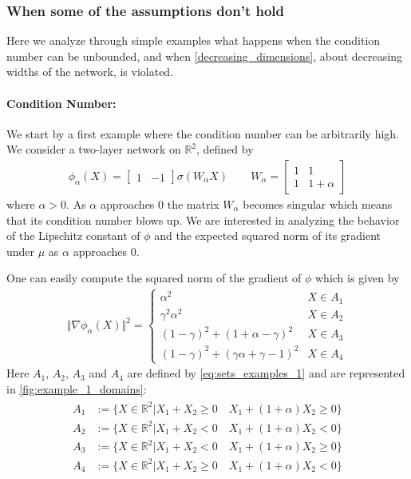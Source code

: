 \documentclass{article}
\newcommand{\R}{\mathbb R}
\begin{document}
\subsubsection{When some of the assumptions don't hold} \label{sec:counterexamples}
Here we analyze through simple examples what happens when the condition number can be unbounded, and when \cref{decreasing_dimensions}, about decreasing widths of the network, is violated.
\paragraph{Condition Number:}\label{example_condition_number}
We start by a first example where the condition number can be arbitrarily high. We consider a two-layer network on $\R^2$, defined by
\begin{align}
  \phi_{\alpha}(X)= \begin{bmatrix}1 & -1\end{bmatrix} \sigma(W_\alpha X) \qquad W_{\alpha} = \begin{bmatrix}
    1 & 1\\
    1 & 1+\alpha
  \end{bmatrix}
\label{eq:example_1}
\end{align}
where $\alpha >0$. As $\alpha$ approaches $0$ the matrix $W_\alpha$ becomes singular which means that its condition number blows up. We are interested in analyzing the behavior of the Lipschitz constant of $\phi$ and the expected squared norm of its gradient under $\mu$ as $\alpha$ approaches $0$.

One can easily compute the squared norm of the gradient of $\phi$ which is given by
\begin{align}
  \Vert \nabla \phi_{\alpha}(X)\Vert^2 = \begin{cases}
    \alpha^2 & X\in A_1\\
    \gamma^2 \alpha^2 & X\in A_2\\
    (1-\gamma)^2 + (1+\alpha -\gamma)^2 & X\in A_3\\
    (1-\gamma)^2 + (\gamma \alpha +\gamma -1)^2 & X\in A_4
  \end{cases}
\end{align}
Here $A_1$, $A_2$, $A_3$ and $A_4$ are defined by \cref{eq:sets_examples_1} and are represented in \cref{fig:example_1_domains}:
\begin{align}\label{eq:sets_examples_1}
\begin{split}
A_1 &:= \{X\in\R^2 | X_1 + X_2\geq 0 \quad X_1 + (1+\alpha)X_2\geq 0 \}\\
A_2 &:= \{X\in\R^2 | X_1 + X_2< 0 \quad X_1 + (1+\alpha)X_2< 0 \}\\
A_3 &:= \{X\in\R^2 | X_1 + X_2< 0 \quad X_1 + (1+\alpha)X_2\geq 0 \}\\
A_4 &:= \{X\in\R^2 | X_1 + X_2\geq 0 \quad X_1 + (1+\alpha)X_2< 0 \}
\end{split}
\end{align}
\end{document}
